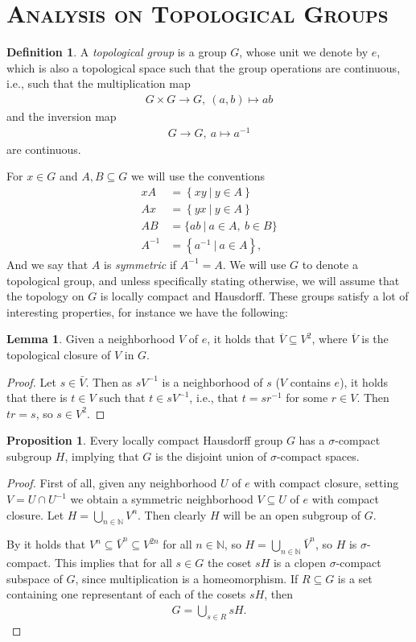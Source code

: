 \documentclass[10pt,twoside,openany,final]{memoir}
\newcommand{\sssection}[1]{%
\section[#1]{\centering\normalfont\scshape \textbf{#1}}}
\theoremstyle{definition}
\newtheorem{lemma}[theorem]{Lemma}
\newtheorem{proposition}[theorem]{Proposition}
\newtheorem{definition}[theorem]{Definition}
\theoremstyle{Break}
\newcommand{\N}{\mathbb{N}}
\begin{document}
\sssection{Analysis on Topological Groups}
\begin{definition}
	A \emph{topological group} is a group $G$, whose unit we denote by $e$, which is also a topological space such that the group operations are continuous, i.e., such that the multiplication map
	\begin{align*}
		G \times G \to G,\ (a,b) \mapsto ab
	\end{align*}
	and the inversion map
	\begin{align*}
		G \to G, \ a \mapsto a^{-1}
	\end{align*}
	are continuous.
\end{definition}
For $x \in G$ and $A,B \subseteq G$ we will use the conventions
\begin{align*}
	xA&= \left\{ xy \ | \ y \in A \right\}\\
	Ax&= \left\{ yx \ | \ y \in A \right\}\\
	AB&= \{ab \ | \ a \in A , \ b \in B\}\\
	A^{-1} &= \left\{ a^{-1} \ | \ a \in A \right\},
\end{align*}
And we say that $A$ is \emph{symmetric} if $A^{-1}=A$.
We will use $G$ to denote a topological group, and unless specifically stating otherwise, we will assume that the topology on $G$ is locally compact and Hausdorff. These groups satisfy a lot of interesting properties, for instance we have the following:
\begin{lemma}
	Given a neighborhood $V$ of $e$, it holds that $\overline{V} \subseteq V^2$, where $\overline{V}$ is the topological closure of $V$ in $G$.
	\label{V sub VV}
\end{lemma}
\begin{proof}
	Let $s \in \bar{V}$. Then as $sV^{-1}$ is a neighborhood of $s$ ($V$ contains $e$), it holds that there is $t \in V$ such that $t\in sV^{-1}$, i.e., that $t=sr^{-1}$ for some $r \in V$. Then $tr=s$, so $s \in V^{2}$.
\end{proof}

\begin{proposition}
	Every locally compact Hausdorff group $G$ has a $\sigma$-compact subgroup $H$, implying that $G$ is the disjoint union of $\sigma$-compact spaces.
	\label{Topg:Disjoint}
\end{proposition}
\begin{proof}
	First of all, given any neighborhood $U$ of $e$ with compact closure, setting $V=U \cap U^{ -1}$ we obtain a symmetric neighborhood $V \subseteq U$ of $e$ with compact closure. Let $H=\bigcup_{n \in \N}V^n$. Then clearly $H$ will be an open subgroup of $G$. 

	By  it holds that $V^n \subseteq \bar{V}^n \subseteq V^{2n}$ for all $n \in \N$, so $H=\bigcup_{n \in \N}\bar{V}^n$, so $H$ is $\sigma$-compact. This implies that for all $s \in G$ the coset $sH$ is a clopen $\sigma$-compact subspace of $G$, since multiplication is a homeomorphism. If $R \subseteq G$ is a set containing one representant of each of the cosets $sH$,  then
	\begin{align*}
		G=\bigcup_{s \in R}sH.
	\end{align*}
\end{proof}
\end{document}
